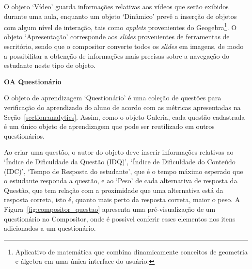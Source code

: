 O objeto `Vídeo' guarda informações relativas aos vídeos que serão exibidos durante uma aula, enquanto um objeto `Dinâmico' prevê a inserção de objetos com algum nível de interação, tais como \textit{applets} provenientes do Geogebra\footnote{Aplicativo de matemática que combina dinamicamente conceitos de geometria e álgebra em uma única interface do usuário.}. O objeto `Apresentação' corresponde aos \textit{slides} provenientes de ferramentas de escritório, sendo que o compositor converte todos os \textit{slides} em imagens, de modo a possibilitar a obtenção de informações mais precisas sobre a navegação do estudante neste tipo de objeto.



\textbf{OA Questionário}

O objeto de aprendizagem `Questionário' é uma coleção de questões para verificação do aprendizado do aluno de acordo com as métricas apresentadas na Seção~\ref{section:analytics}. Assim, como o objeto Galeria, cada questão cadastrada é um único objeto de aprendizagem que pode ser reutilizado em outros questionários.

Ao criar uma questão, o autor do objeto deve inserir informações relativas ao `Índice de Dificuldade da Questão (IDQ)', `Índice de Dificuldade do Conteúdo (IDC)', `Tempo de Resposta do estudante', que é o tempo máximo esperado que o estudante responda a questão, e ao `Peso' de cada alternativa de resposta da Questão, que tem relação com a proximidade que uma alternativa está da resposta correta, isto é, quanto mais perto da resposta correta, maior o peso. 
A Figura~\ref{fig:compositor_questao} apresenta uma pré-visualização de um questionário no Compositor, onde é possível conferir esses elementos nos itens adicionados a um questionário.

